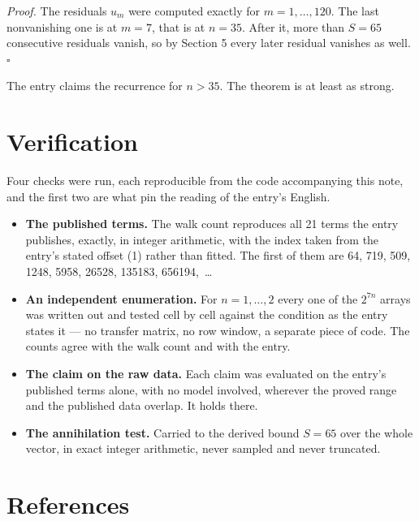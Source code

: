 \documentclass[11pt]{article}
\theoremstyle{definition}
\begin{document}
{\itshape Proof.} The residuals $u_m$ were computed exactly for $m = 1,\dots,120$. The last nonvanishing one is at $m = 7$, that is at $n = 35$. After it, more than $S = 65$ consecutive residuals vanish, so by Section 5 every later residual vanishes as well. $\square$

The entry claims the recurrence for $n > 35$. The theorem is at least as strong.

\section{Verification}

Four checks were run, each reproducible from the code accompanying this note, and the first two are what pin the reading of the entry's English.

\begin{itemize}

\item {\bfseries The published terms.} The walk count reproduces all 21 terms the entry publishes, exactly, in integer arithmetic, with the index taken from the entry's stated offset (1) rather than fitted. The first of them are 64, 719, 509, 1248, 5958, 26528, 135183, 656194,~\dots

\item {\bfseries An independent enumeration.} For $n = 1,\dots,2$ every one of the $2^{7n}$ arrays was written out and tested cell by cell against the condition as the entry states it --- no transfer matrix, no row window, a separate piece of code. The counts agree with the walk count and with the entry.

\item {\bfseries The claim on the raw data.} Each claim was evaluated on the entry's published terms alone, with no model involved, wherever the proved range and the published data overlap. It holds there.

\item {\bfseries The annihilation test.} Carried to the derived bound $S = 65$ over the whole vector, in exact integer arithmetic, never sampled and never truncated.

\end{itemize}

\section{References}
\end{document}
